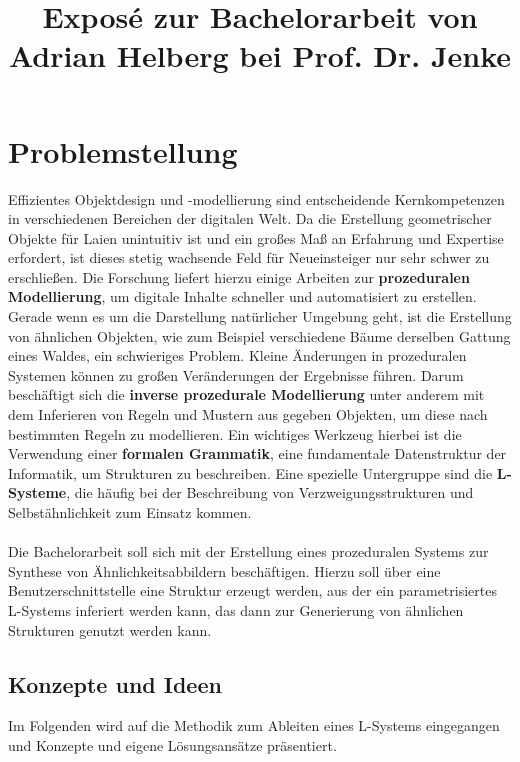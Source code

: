 \documentclass[11pt]{article}
\title{\textbf{Exposé} zur Bachelorarbeit von Adrian Helberg bei Prof. Dr. Jenke}
\begin{document}
    \maketitle

    \section{Problemstellung}

    Effizientes Objektdesign und -modellierung sind entscheidende Kernkompetenzen in verschiedenen Bereichen der
    digitalen Welt.
    Da die Erstellung geometrischer Objekte für Laien unintuitiv ist und ein großes Maß an Erfahrung und Expertise
    erfordert, ist dieses stetig wachsende Feld für Neueinsteiger nur sehr schwer zu erschließen.
    Die Forschung liefert hierzu einige Arbeiten zur \textbf{prozeduralen Modellierung}, um digitale Inhalte schneller
    und automatisiert zu erstellen.
    Gerade wenn es um die Darstellung natürlicher Umgebung geht, ist die Erstellung von ähnlichen Objekten, wie
    zum Beispiel verschiedene Bäume derselben Gattung eines Waldes, ein schwieriges Problem.
    Kleine Änderungen in prozeduralen Systemen können zu großen Veränderungen der Ergebnisse führen.
    Darum beschäftigt sich die \textbf{inverse prozedurale Modellierung} unter anderem mit dem Inferieren von Regeln
    und Mustern aus gegeben Objekten, um diese nach bestimmten Regeln zu modellieren.
    Ein wichtiges Werkzeug hierbei ist die Verwendung einer \textbf{formalen Grammatik}, eine fundamentale Datenstruktur
    der Informatik, um Strukturen zu beschreiben.
    Eine spezielle Untergruppe sind die \textbf{L-Systeme}, die häufig bei der Beschreibung
    von Verzweigungsstrukturen und Selbstähnlichkeit zum Einsatz kommen.\\~\\
    Die Bachelorarbeit soll sich mit der Erstellung eines prozeduralen Systems zur Synthese von Ähnlichkeitsabbildern
    beschäftigen.
    Hierzu soll über eine Benutzerschnittstelle eine Struktur erzeugt werden, aus der ein parametrisiertes L-Systems
    inferiert werden kann, das dann zur Generierung von ähnlichen Strukturen genutzt werden kann.

    \subsection{Konzepte und Ideen}
    Im Folgenden wird auf die Methodik zum Ableiten eines L-Systems eingegangen und Konzepte und eigene Lösungsansätze
    präsentiert.
\end{document}
